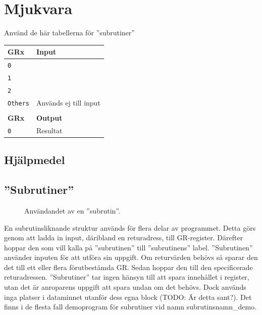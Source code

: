 \documentclass[]{article}
\begin{document}
\newpage
\section{Mjukvara}

Använd de här tabellerna för ''subrutiner''\\


\begin{tabular}{ll}
	\textbf{GRx}    & \textbf{Input}        \\ \hline
	\texttt{0}      &  \\
	\texttt{1}      &  \\
	\texttt{2}      &  \\
	\texttt{Others} & Används ej till input \\
	                &  \\
	\textbf{GRx}    & \textbf{Output}       \\ \hline
	\texttt{0}      & Resultat
\end{tabular}


\subsection{Hjälpmedel}

\subsection{''Subrutiner''}
\begin{figure}[h!]
	\caption{Användandet av en ''subrutin''. }
\end{figure}

En subrutinsliknande struktur används för flera delar av programmet. Detta görs genom att ladda in input, däribland en returadress, till GR-register. Därefter hoppar den som vill kalla på ''subrutinen'' till ''subrutinens'' label. ''Subrutinen'' använder inputen för att utföra sin uppgift. Om returvärden behövs så sparar den det till ett eller flera förutbestämda GR. Sedan hoppar den till den specificerade returadressen. ''Subrutiner'' tar ingen hänsyn till att spara innehållet i register, utan det är anroparens uppgift att spara undan om det behövs. Dock används inga platser i dataminnet utanför dess egna block (TODO: Är detta sant?). Det finns i de flesta fall demoprogram för subrutiner vid namn subrutinsnamn\_demo.
\end{document}
